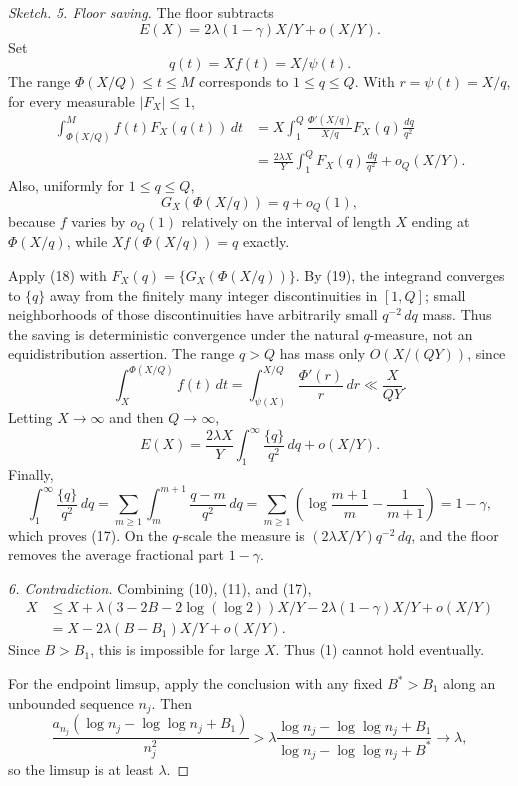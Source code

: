\documentclass[10pt]{article}
\newcommand{\dd}{\,d}
\newcommand{\fp}[1]{\{#1\}}
\begin{document}
\begin{proof}[Sketch]
\smallskip
\noindent\textit{5. Floor saving.}
The floor subtracts
\[
        E(X)=2\lambda(1-\gamma)X/Y+o(X/Y).                    \tag{17}
\]
Set
\[
        q(t)=Xf(t)=X/\psi(t).
\]
The range $\Phi(X/Q)\le t\le M$ corresponds to $1\le q\le Q$.  With
$r=\psi(t)=X/q$, for every measurable $|F_X|\le1$,
\begin{align*}
        \int_{\Phi(X/Q)}^M f(t)F_X(q(t))\dd t
        &=X\int_1^Q \frac{\Phi'(X/q)}{X/q}F_X(q)\frac{\dd q}{q^2}  \\
        &=\frac{2\lambda X}{Y}\int_1^Q F_X(q)\frac{\dd q}{q^2}
        +o_Q(X/Y).                                             \tag{18}
\end{align*}
Also, uniformly for $1\le q\le Q$,
\[
        G_X(\Phi(X/q))=q+o_Q(1),                               \tag{19}
\]
because $f$ varies by $o_Q(1)$ relatively on the interval of length $X$ ending
at $\Phi(X/q)$, while $Xf(\Phi(X/q))=q$ exactly.

Apply (18) with $F_X(q)=\fp{G_X(\Phi(X/q))}$.  By (19), the integrand converges
to $\fp q$ away from the finitely many integer discontinuities in $[1,Q]$;
small neighborhoods of those discontinuities have arbitrarily small
$q^{-2}\dd q$ mass.  Thus the saving is deterministic convergence under the
natural $q$-measure, not an equidistribution assertion.  The range $q>Q$ has
mass only $O(X/(QY))$, since
\[
        \int_X^{\Phi(X/Q)} f(t)\dd t
        =\int_{\psi(X)}^{X/Q}\frac{\Phi'(r)}r\dd r
        \ll \frac{X}{QY}.
\]
Letting $X\to\infty$ and then $Q\to\infty$,
\[
        E(X)=\frac{2\lambda X}{Y}
        \int_1^\infty\frac{\fp q}{q^2}\dd q+o(X/Y).
\]
Finally,
\[
        \int_1^\infty\frac{\fp q}{q^2}\dd q
        =\sum_{m\ge1}\int_m^{m+1}\frac{q-m}{q^2}\dd q
        =\sum_{m\ge1}\left(\log\frac{m+1}{m}-\frac1{m+1}\right)
        =1-\gamma,
\]
which proves (17).  On the $q$-scale the measure is
$(2\lambda X/Y)q^{-2}\dd q$, and the floor removes the average fractional part
$1-\gamma$.

\smallskip
\noindent\textit{6. Contradiction.}
Combining (10), (11), and (17),
\[
\begin{aligned}
        X
        &\le X+\lambda(3-2B-2\log(\log2))X/Y
        -2\lambda(1-\gamma)X/Y+o(X/Y) \\
        &=X-2\lambda(B-B_1)X/Y+o(X/Y).
\end{aligned}
\]
Since $B>B_1$, this is impossible for large $X$.  Thus (1) cannot hold
eventually.

For the endpoint limsup, apply the conclusion with any fixed $B^*>B_1$ along
an unbounded sequence $n_j$.  Then
\[
        \frac{a_{n_j}(\log n_j-\log\log n_j+B_1)}{n_j^2}
        >\lambda
        \frac{\log n_j-\log\log n_j+B_1}
             {\log n_j-\log\log n_j+B^*}
        \to\lambda,
\]
so the limsup is at least $\lambda$.
\end{proof}
\end{document}
